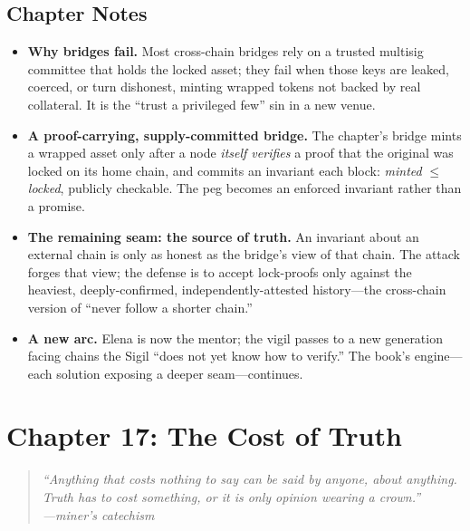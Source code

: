 \documentclass[12pt,letterpaper]{book}
\providecommand{\tightlist}{\setlength{\itemsep}{0pt}\setlength{\parskip}{0pt}}
\begin{document}
\hypertarget{chapter-16-notes}{%
\subsection{Chapter Notes}\label{chapter-16-notes}}

\begin{itemize}
\tightlist
\item
  \textbf{Why bridges fail.} Most cross-chain bridges rely on a trusted
  multisig committee that holds the locked asset; they fail when those keys are
  leaked, coerced, or turn dishonest, minting wrapped tokens not backed by real
  collateral. It is the ``trust a privileged few'' sin in a new venue.
\item
  \textbf{A proof-carrying, supply-committed bridge.} The chapter's bridge mints a
  wrapped asset only after a node \emph{itself verifies} a proof that the original
  was locked on its home chain, and commits an invariant each block:
  \emph{minted} $\leq$ \emph{locked}, publicly checkable. The peg becomes an
  enforced invariant rather than a promise.
\item
  \textbf{The remaining seam: the source of truth.} An invariant about an external
  chain is only as honest as the bridge's view of that chain. The attack forges
  that view; the defense is to accept lock-proofs only against the heaviest,
  deeply-confirmed, independently-attested history---the cross-chain version of
  ``never follow a shorter chain.''
\item
  \textbf{A new arc.} Elena is now the mentor; the vigil passes to a new
  generation facing chains the Sigil ``does not yet know how to verify.'' The
  book's engine---each solution exposing a deeper seam---continues.
\end{itemize}


\hypertarget{chapter-17-the-cost-of-truth}{%
\section{Chapter 17: The Cost of
Truth}\label{chapter-17-the-cost-of-truth}}

\begin{quote}
\itshape ``Anything that costs nothing to say can be said by anyone, about
anything. Truth has to cost something, or it is only opinion wearing a
crown.''\\
\normalfont\hfill---miner's catechism
\end{quote}
\end{document}
